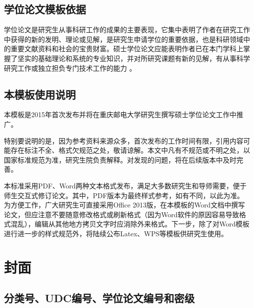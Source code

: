 \documentclass{cqupt_thesis}
\begin{document}
    \subsection{学位论文模板依据}

    学位论文是研究生从事科研工作的成果的主要表现，它集中表明了作者在研究工作中获得的新的发明、理论或见解，是研究生申请学位的重要依据，也是科研领域中的重要文献资料和社会的宝贵财富。硕士学位论文应能表明作者已在本门学科上掌握了坚实的基础理论和系统的专业知识，并对所研究课题有新的见解，有从事科学研究工作或独立担负专门技术工作的能力 。


    \subsection{本模板使用说明}
    本模板是2015年首次发布并将在重庆邮电大学研究生撰写硕士学位论文工作中推广。

    特别要说明的是，因为参考资料来源众多，首次发布的工作时间有限，引用内容可能存在标注不全、格式欠规范之处，敬请谅解。本文中凡有不规范或不明之处，以国家标准规范为准，研究生院负责解释。对发现的问题，将在后续版本中及时完善。

    本标准采用PDF、Word两种文本格式发布，满足大多数研究生和导师需要，便于师生交互式修订论文。其中，PDF版本为最终样式参考，如有不同，以此为准。为方便工作，广大研究生可直接采用Office 2013版，在本模板的Word文档中撰写论文，但应注意不要随意修改格式或刷新格式（因为Word软件的原因容易导致格式混乱），编辑从其他地方拷贝文字时应消除外来格式。下一步，除了对Word模板进行进一步的样式规范外，将陆续公布Latex、WPS等模板供研究生使用。


    \section{封面}

    \subsection{分类号、UDC编号、学位论文编号和密级}
\end{document}
